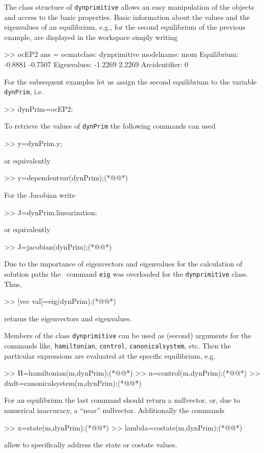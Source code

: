 The class structure of \lstinline+dynprimitive+ allows an easy manipulation of the objects and access to the basic properties. Basic information about the values and the eigenvalues of an equilibrium, e.g., for the second equilibrium of the previous example, are displayed in the workspace simply writing
\begin{matlab} 
>> ocEP{2}
ans =
ocmatclass: dynprimitive
modelname: mom
Equilibrium:
   -0.8881
   -0.7507
Eigenvalues:
   -1.2269
    2.2269
Arcidentifier:
     0
\end{matlab}
For the subsequent examples let us assign the second equilibrium to the variable \lstinline+dynPrim+, i.e.
\begin{matlab} 
>> dynPrim=ocEP{2};
\end{matlab}
To retrieve the values of \lstinline+dynPrim+ the following commands can used
\begin{matlab} 
>> y=dynPrim.y;
\end{matlab}
or equivalently
\begin{matlab} 
>> y=dependentvar(dynPrim);(*@@*)
\end{matlab}
For the Jacobian write
\begin{matlab} 
>> J=dynPrim.linearization;
\end{matlab}
or equivalently
\begin{matlab} 
>> J=jacobian(dynPrim);(*@@*)
\end{matlab}
Due to the importance of eigenvectors and eigenvalues for the calculation of solution paths the \MATL\ command \lstinline+eig+ was overloaded for the \lstinline+dynprimitive+ class. Thus,
\begin{matlab} 
>> [vec val]=eig(dynPrim);(*@@*)
\end{matlab}
returns the eigenvectors and eigenvalues.

Members of the class \lstinline+dynprimitive+ can be used as (second) arguments for the commands like, \lstinline+hamiltonian+, \lstinline+control+, \lstinline+canonicalsystem+, etc. Then the particular expressions are evaluated at the specific equilibrium, e.g.
\begin{matlab} 
>> H=hamiltonian(m,dynPrim);(*@@*)
>> u=control(m,dynPrim);(*@@*)
>> dxdt=canonicalsystem(m,dynPrim);(*@@*)
\end{matlab}
For an equilibrium the last command should return a nullvector, or, due to numerical inaccuracy, a ``near'' nullvector. Additionally the commands
\begin{matlab} 
>> x=state(m,dynPrim);(*@@*)
>> lambda=costate(m,dynPrim);(*@@*)
\end{matlab}
allow to specifically address the state or costate values.

